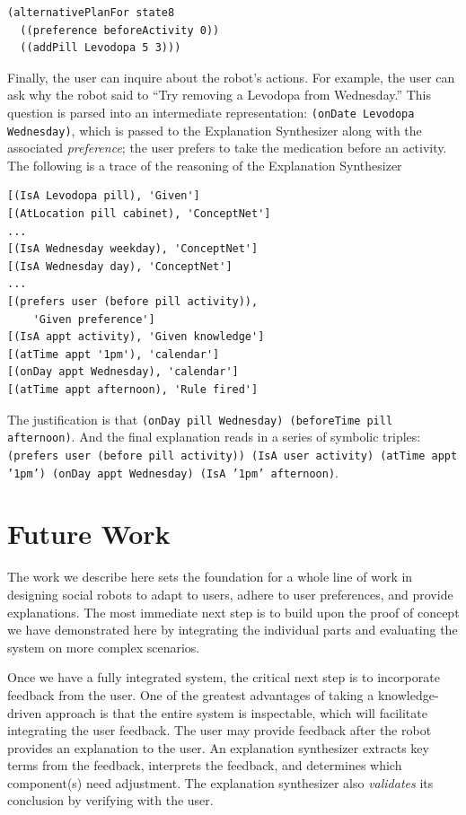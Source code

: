 \documentclass[letterpaper]{article} %
\begin{document}
\small{
\begin{verbatim}
(alternativePlanFor state8
  ((preference beforeActivity 0))
  ((addPill Levodopa 5 3)))
\end{verbatim}}


Finally, the user can inquire about the robot's actions.  For example, the user can ask why the robot said to ``Try removing a Levodopa from Wednesday.''  This question is parsed into an intermediate representation: \texttt{(onDate Levodopa Wednesday)}, which is passed to the Explanation Synthesizer along with the associated \emph{preference}; the user prefers to take the medication before an activity.
The following is a trace of the reasoning of the Explanation Synthesizer

\small{
\begin{verbatim}
[(IsA Levodopa pill), 'Given']
[(AtLocation pill cabinet), 'ConceptNet']
...
[(IsA Wednesday weekday), 'ConceptNet']
[(IsA Wednesday day), 'ConceptNet']
...
[(prefers user (before pill activity)),
    'Given preference']
[(IsA appt activity), 'Given knowledge']
[(atTime appt '1pm'), 'calendar']
[(onDay appt Wednesday), 'calendar']
[(atTime appt afternoon), 'Rule fired']
\end{verbatim}}

The justification is that \texttt{(onDay pill Wednesday) (beforeTime pill
afternoon)}.  And the final explanation reads in a series of symbolic
triples: \texttt{(prefers user (before pill activity)) (IsA user activity) (atTime appt '1pm') (onDay appt Wednesday) (IsA '1pm' afternoon)}.

\section{Future Work}
The work we describe here sets the foundation for a whole line of work in
designing social robots to adapt to users, adhere to user preferences, and
provide explanations.  The most immediate next step is to build upon the
proof of concept we have demonstrated here by integrating the individual
parts and evaluating the system on more complex scenarios.

Once we have a fully integrated system, the critical next step is to
incorporate feedback from the user.
One of the greatest advantages of taking a knowledge-driven approach is
that the entire system is inspectable, which will facilitate integrating
the user feedback.
The user may provide feedback after the robot provides an explanation to
the user.  An explanation synthesizer extracts key terms from the
feedback, interprets the feedback, and determines which component(s)
need adjustment.  The explanation synthesizer also \emph{validates} its
conclusion by verifying with the user.
\end{document}
